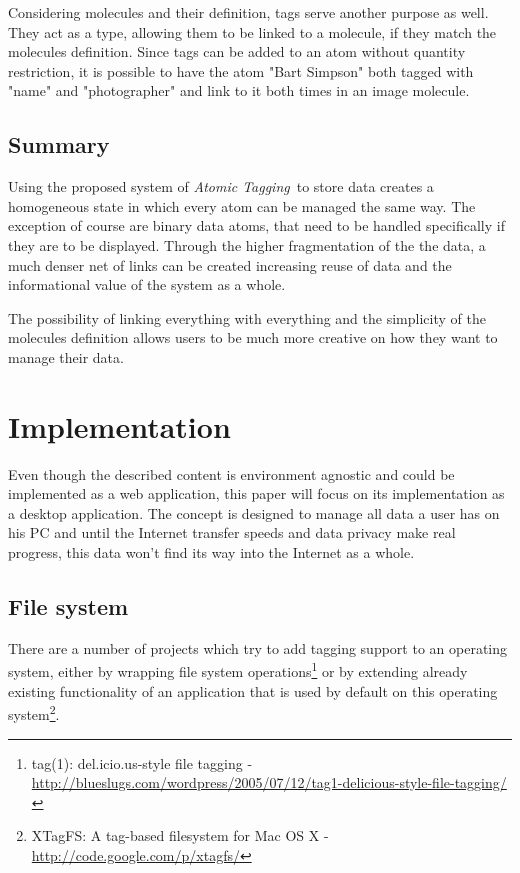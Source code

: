 \documentclass[12pt,a4paper,notitlepage,twocolumn,oneside]{article}
\newcommand{\at}{{\emph{Atomic Tagging}}}
\begin{document}
Considering molecules and their definition, tags serve another purpose as well. They act as a type, allowing them to be linked to a molecule, if they match the molecules definition. Since tags can be added to an atom without quantity restriction, it is possible to have the atom "Bart Simpson" both tagged with "name" and "photographer" and link to it both times in an image molecule.

\subsection{Summary}
Using the proposed system of \at\ to store data creates a homogeneous state in which every atom can be managed the same way. The exception of course are binary data atoms, that need to be handled specifically if they are to be displayed. Through the higher fragmentation of the the data, a much denser net of links can be created increasing reuse of data and the informational value of the system as a whole. 

The possibility of linking everything with everything and the simplicity of the molecules definition allows users to be much more creative on how they want to manage their data.



\section{Implementation}\label{implementation}
Even though the described content is environment agnostic and could be implemented as a web application, this paper will focus on its implementation as a desktop application. The concept is designed to manage all data a user has on his PC and until the Internet transfer speeds and data privacy make real progress, this data won't find its way into the Internet as a whole.

\subsection{File system}\label{file_system}
There are a number of projects which try to add tagging support to an operating system, either by wrapping file system operations\footnote{tag(1): del.icio.us-style file tagging - \url{http://blueslugs.com/wordpress/2005/07/12/tag1-delicious-style-file-tagging/}} or by extending already existing functionality of an application that is used by default on this operating system\footnote{XTagFS: A tag-based filesystem for Mac OS X - \url{http://code.google.com/p/xtagfs/}}.
\end{document}
